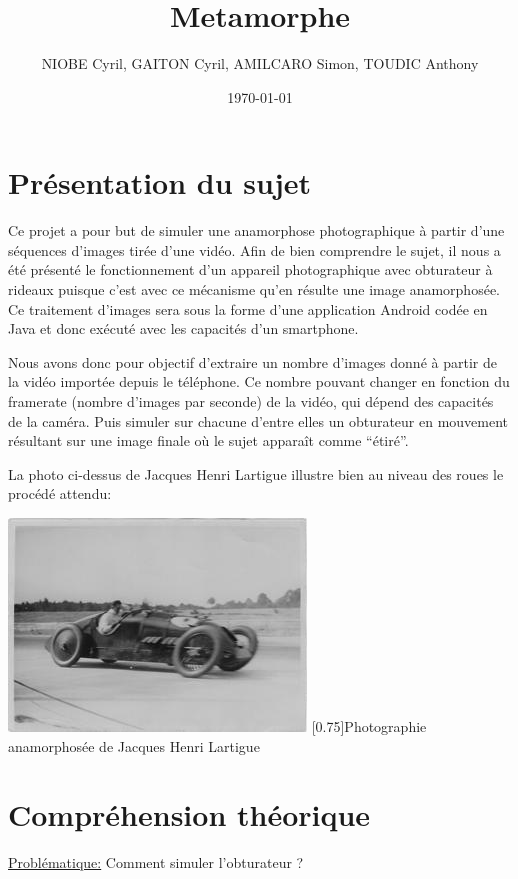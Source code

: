 \documentclass[a4paper,12pt]{report}
\title{Metamorphe}
\author{NIOBE Cyril, GAITON Cyril, AMILCARO Simon, TOUDIC Anthony}
\date{\today}
\begin{document}
\maketitle
\tableofcontents
\setcounter{tocdepth}{5}

\chapter{Présentation du sujet}
Ce projet a pour but de simuler une anamorphose photographique à partir d’une séquences d’images tirée d’une vidéo.
Afin de bien comprendre le sujet, il nous a été présenté le fonctionnement d’un appareil photographique avec obturateur à rideaux puisque c’est avec ce mécanisme qu’en résulte une image anamorphosée.
Ce traitement d’images sera sous la forme d’une application Android codée en Java et donc exécuté avec les capacités d’un smartphone.\par\bigskip

Nous avons donc pour objectif d’extraire un nombre d’images donné à partir de la vidéo importée depuis le téléphone. 
Ce nombre pouvant changer en fonction du framerate (nombre d’images par seconde) de la vidéo, qui dépend des capacités de la caméra. 
Puis simuler sur chacune d’entre elles un obturateur en mouvement résultant sur une image finale où le sujet apparaît comme “étiré”.\par\bigskip

La photo ci-dessus de Jacques Henri Lartigue illustre bien au niveau des roues le procédé attendu:\bigskip
\begin{center}
 \includegraphics[scale=2.5]{./anamorphose.jpg}
 \scalebox{0.75}[0.75]{Photographie anamorphosée de Jacques Henri Lartigue}
\end{center}

\chapter{Compréhension théorique}
\underline{Problématique:} Comment simuler l'obturateur ?\bigskip
\end{document}
